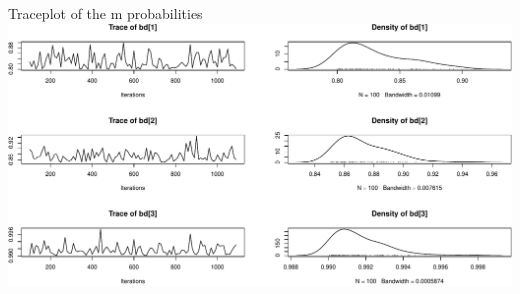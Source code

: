 \documentclass[
  ignorenonframetext,
]{beamer}
\begin{document}
\begin{frame}{Traceplot of the m probabilities}
\includegraphics{bayesian-fellegi-sunter-vignette_files/figure-beamer/unnamed-chunk-10-4.pdf}

\end{frame}
\end{document}
